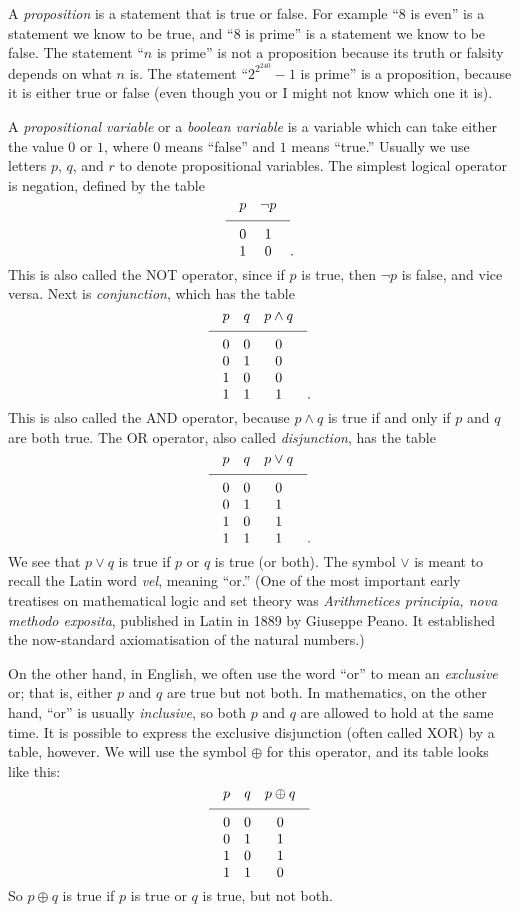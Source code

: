 A {\it proposition} is a statement that is true or false. For example ``$8$ is even'' is a statement
we know to be true, and ``$8$ is prime'' is a statement we know to be false. The statement
``$n$ is prime'' is not a proposition because its truth or falsity depends on what $n$ is.
The statement
``$2^{2^{240}} - 1$ is prime'' is a proposition, because it is either true or false (even though you or I
might not know which one it is).

A {\it propositional variable} or a {\it boolean variable} is a variable which can take either the
value $0$ or $1$, where $0$ means ``false'' and $1$ means ``true.'' Usually we use letters $p$, $q$,
and $r$ to denote propositional variables. The simplest logical operator is negation, defined
by the table
$$
\vbox{
\tabskip=1em plus.2em minus .2em
\halign{
\hfil$#$\hfil & \hfil$#$\hfil \cr
p & \neg p \cr
\noalign{\medskip}
\noalign{\hrule}
\noalign{\medskip}
0 & 1 \cr
1 & 0 \cr
}}.
$$
This is also called the {\mc NOT} operator, since if $p$ is true, then $\neg p$
is false, and vice versa.
Next is {\it conjunction}, which has the table
$$
\vbox{
\tabskip=1em plus.2em minus .2em
\halign{
\hfil$#$\hfil & \hfil$#$\hfil & \hfil$#$\hfil \cr
p & q & p\wedge q \cr
\noalign{\medskip}
\noalign{\hrule}
\noalign{\medskip}
0 & 0 & 0 \cr
0 & 1 & 0 \cr
1 & 0 & 0 \cr
1 & 1 & 1 \cr
}}.
$$
This is also called the {\mc AND} operator, because $p\wedge q$ is true if and only if $p$ and
$q$ are both true. The {\mc OR} operator, also called {\it disjunction}, has the table
$$
\vbox{
\tabskip=1em plus.2em minus .2em
\halign{
\hfil$#$\hfil & \hfil$#$\hfil & \hfil$#$\hfil \cr
p & q & p\vee q \cr
\noalign{\medskip}
\noalign{\hrule}
\noalign{\medskip}
0 & 0 & 0 \cr
0 & 1 & 1 \cr
1 & 0 & 1 \cr
1 & 1 & 1 \cr
}}.
$$
We see that $p\vee q$ is true if $p$ or $q$ is true (or both). The symbol $\vee$ is meant to recall
the Latin word {\it vel}, meaning ``or.'' (One of the most important early treatises on mathematical
logic and set theory was {\sl Arithmetices principia, nova methodo exposita}, published in Latin in 1889
by Giuseppe Peano. It established the now-standard axiomatisation of the natural numbers.)

On the other hand, in English, we often use the word ``or''
to mean an {\it exclusive} or; that is, either $p$ and $q$ are true but not both. In mathematics, on the
other hand, ``or'' is usually {\it inclusive}, so both $p$ and $q$ are allowed to hold at the same time.
It is possible to express the exclusive disjunction (often called {\mc XOR})
by a table, however. We will use the symbol $\oplus$ for this operator, and its table looks like this:
$$
\vbox{
\tabskip=1em plus.2em minus .2em
\halign{
\hfil$#$\hfil & \hfil$#$\hfil & \hfil$#$\hfil \cr
p & q & p\oplus q \cr
\noalign{\medskip}
\noalign{\hrule}
\noalign{\medskip}
0 & 0 & 0 \cr
0 & 1 & 1 \cr
1 & 0 & 1 \cr
1 & 1 & 0 \cr
}}
$$
So $p\oplus q$ is true if $p$ is true or $q$ is true, but not both.

